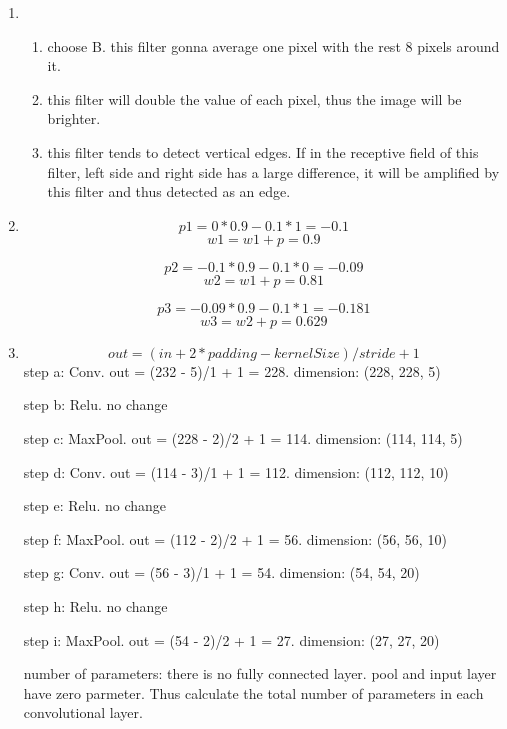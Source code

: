 \documentclass[12pt]{article}
\begin{document}
\begin{enumerate}
\item
\begin{enumerate}
\item choose B. this filter gonna average one pixel with the rest 8 pixels around it.
\item this filter will double the value of each pixel, thus the image will be brighter.
\item this filter tends to detect vertical edges. If in the receptive field of this filter, left side and right side has a large difference, it will be amplified by this filter and thus detected as an edge. 
\end{enumerate}

\item  
    $$ p1 = 0 * 0.9 - 0.1 * 1 = -0.1 $$
    $$ w1 = w1 + p = 0.9 $$

    $$ p2 = -0.1 * 0.9 - 0.1 * 0 = -0.09 $$
    $$ w2 = w1 + p = 0.81 $$

    $$ p3 = -0.09 * 0.9 - 0.1 * 1 = -0.181 $$
    $$ w3 = w2 + p  = 0.629$$ 


\item
   $$ out = (in + 2 * padding - kernelSize)/stride + 1 $$
   step a: Conv. out = (232 - 5)/1 + 1 = 228. dimension: (228, 228, 5) 
   
   step b: Relu. no change
   
   step c: MaxPool. out = (228 - 2)/2 + 1 = 114. dimension: (114, 114, 5)
  
   step d: Conv. out = (114 - 3)/1 + 1 = 112. dimension: (112, 112, 10)

   step e: Relu. no change

   step f: MaxPool. out = (112 - 2)/2 + 1 = 56. dimension: (56, 56, 10)

    step g: Conv. out = (56 - 3)/1 + 1 = 54. dimension: (54, 54, 20)

    step h: Relu. no change

    step i: MaxPool. out = (54 - 2)/2 + 1 = 27. dimension: (27, 27, 20)

    number of parameters: there is no fully connected layer. pool and input layer have zero parmeter. Thus calculate the total number of parameters in each convolutional layer.


\end{enumerate}
\end{document}
